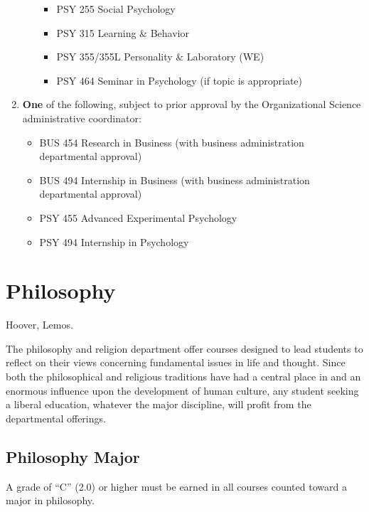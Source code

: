 \documentclass[
  letterpaper,
]{scrbook}
\providecommand{\tightlist}{%
  \setlength{\itemsep}{0pt}\setlength{\parskip}{0pt}}
\begin{document}
\begin{enumerate}
\begin{enumerate}
    \begin{itemize}
    \tightlist
    \item
      PSY 255 Social Psychology
    \item
      PSY 315 Learning \& Behavior
    \item
      PSY 355/355L Personality \& Laboratory (WE)
    \item
      PSY 464 Seminar in Psychology (if topic is appropriate)
    \end{itemize}
  \end{enumerate}
\item
  \textbf{One} of the following, subject to prior approval by the
  Organizational Science administrative coordinator:

  \begin{itemize}
  \tightlist
  \item
    BUS 454 Research in Business (with business administration
    departmental approval)
  \item
    BUS 494 Internship in Business (with business administration
    departmental approval)
  \item
    PSY 455 Advanced Experimental Psychology
  \item
    PSY 494 Internship in Psychology
  \end{itemize}
\end{enumerate}

\section{Philosophy}\label{philosophy}

Hoover, Lemos.

The philosophy and religion department offer courses designed to lead
students to reflect on their views concerning fundamental issues in life
and thought. Since both the philosophical and religious traditions have
had a central place in and an enormous influence upon the development of
human culture, any student seeking a liberal education, whatever the
major discipline, will profit from the departmental offerings.

\subsection{Philosophy Major}\label{philosophy-major}

A grade of ``C'' (2.0) or higher must be earned in all courses counted
toward a major in philosophy.
\end{document}

